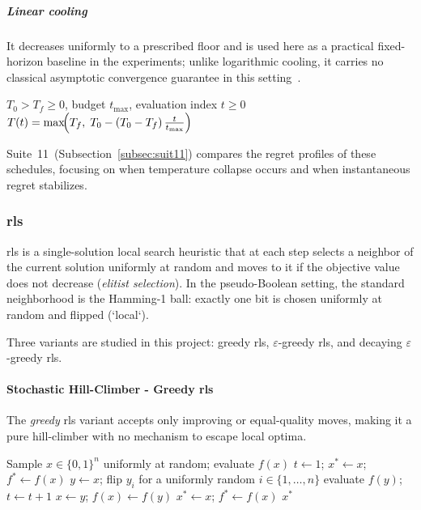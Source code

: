 \subparagraph{Linear cooling}

It decreases uniformly to a prescribed floor and is used here as a
practical fixed-horizon baseline in the experiments; unlike
logarithmic cooling, it carries no classical asymptotic convergence
guarantee in this setting~\cite{bertsimas1993simulated}.
\begin{algorithm}[H]
  \caption{Linear cooling schedule}
  \label{alg:cool-lin}
  \begin{algorithmic}[1]
    \Require $T_0 > T_f \geq 0$, budget $t_{\max}$, evaluation index $t \geq 0$
    \State \Return $T(t) = \max\!\Bigl(T_f,\; T_0 - (T_0 -
    T_f)\,\tfrac{t}{t_{\max}}\Bigr)$
  \end{algorithmic}
\end{algorithm}

Suite~11~(Subsection~\ref{subsec:suit11})
compares the regret profiles of these schedules, focusing on when
temperature collapse occurs and when instantaneous regret
stabilizes.

\subsubsection[\texorpdfstring{Randomized Local Search
(RLS)}{Randomized Local Search (RLS)}]{\acrfull{rls}}
\label{subsubsec:rls}

\acrfull{rls} is a single-solution local search heuristic that at
each step selects a neighbor of the current solution uniformly at
random and moves to it if the objective value does not decrease
(\textit{elitist selection}). In the pseudo-Boolean setting, the
standard neighborhood is the Hamming-1 ball: exactly one bit is
chosen uniformly at random and flipped (`local`).~\cite{hoos2005sls}

Three variants are studied in this project: greedy \acrshort{rls},
$\varepsilon$-greedy \acrshort{rls}, and decaying
$\varepsilon$-greedy \acrshort{rls}.

\paragraph{Stochastic Hill-Climber -
Greedy \acrshort{rls}}

The \textit{greedy} \acrshort{rls} variant accepts only improving or
equal-quality moves, making it a pure hill-climber with no mechanism
to escape local optima.

\begin{algorithm}[H]
  \caption{Greedy RLS (Stochastic Hill Climber)}
  \label{alg:rls-greedy}
  \begin{algorithmic}[1]
    \State Sample $x \in \{0,1\}^n$ uniformly at random; evaluate $f(x)$
    \State $t \gets 1$;\; $x^{*} \gets x$;\; $f^{*} \gets f(x)$
    \Repeat
    \State $y \gets x$;\; flip $y_i$ for a uniformly random $i \in
    \{1,\ldots,n\}$
    \State evaluate $f(y)$;\; $t \gets t + 1$
     $x \gets y$;\; $f(x) \gets f(y)$ \EndIf
     $x^{*} \gets x$;\; $f^{*} \gets f(x)$ \EndIf
    \State \Return $x^{*}$
  \end{algorithmic}
\end{algorithm}

